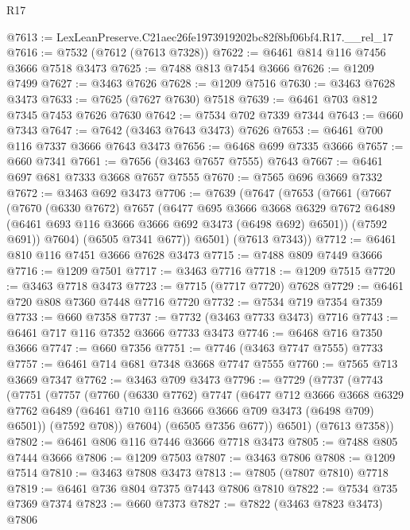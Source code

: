 \begin{lexlean}{R17}
\begin{coremodule}
@7613 := LexLeanPreserve.C21aec26fe1973919202bc82f8bf06bf4.R17.__rel_17
@7616 := @7532 (@7612 (@7613 @7328))
@7622 := @6461 @814 @116 @7456 @3666 @7518 @3473
@7625 := @7488 @813 @7454 @3666
@7626 := @1209 @7499
@7627 := @3463 @7626
@7628 := @1209 @7516
@7630 := @3463 @7628 @3473
@7633 := @7625 (@7627 @7630) @7518
@7639 := @6461 @703 @812 @7345 @7453 @7626 @7630
@7642 := @7534 @702 @7339 @7344
@7643 := @660 @7343
@7647 := @7642 (@3463 @7643 @3473) @7626
@7653 := @6461 @700 @116 @7337 @3666 @7643 @3473
@7656 := @6468 @699 @7335 @3666
@7657 := @660 @7341
@7661 := @7656 (@3463 @7657 @7555) @7643
@7667 := @6461 @697 @681 @7333 @3668 @7657 @7555
@7670 := @7565 @696 @3669 @7332
@7672 := @3463 @692 @3473
@7706 := @7639
    (@7647
      (@7653
        (@7661
          (@7667
            (@7670
              (@6330 @7672)
              @7657
              (@6477
                @695
                @3666
                @3668
                @6329
                @7672
                @6489
                (@6461 @693 @116 @3666 @3666 @692 @3473 (@6498 @692) @6501))
              (@7592 @691))
            @7604)
          (@6505 @7341 @677))
        @6501)
      (@7613 @7343))
@7712 := @6461 @810 @116 @7451 @3666 @7628 @3473
@7715 := @7488 @809 @7449 @3666
@7716 := @1209 @7501
@7717 := @3463 @7716
@7718 := @1209 @7515
@7720 := @3463 @7718 @3473
@7723 := @7715 (@7717 @7720) @7628
@7729 := @6461 @720 @808 @7360 @7448 @7716 @7720
@7732 := @7534 @719 @7354 @7359
@7733 := @660 @7358
@7737 := @7732 (@3463 @7733 @3473) @7716
@7743 := @6461 @717 @116 @7352 @3666 @7733 @3473
@7746 := @6468 @716 @7350 @3666
@7747 := @660 @7356
@7751 := @7746 (@3463 @7747 @7555) @7733
@7757 := @6461 @714 @681 @7348 @3668 @7747 @7555
@7760 := @7565 @713 @3669 @7347
@7762 := @3463 @709 @3473
@7796 := @7729
    (@7737
      (@7743
        (@7751
          (@7757
            (@7760
              (@6330 @7762)
              @7747
              (@6477
                @712
                @3666
                @3668
                @6329
                @7762
                @6489
                (@6461 @710 @116 @3666 @3666 @709 @3473 (@6498 @709) @6501))
              (@7592 @708))
            @7604)
          (@6505 @7356 @677))
        @6501)
      (@7613 @7358))
@7802 := @6461 @806 @116 @7446 @3666 @7718 @3473
@7805 := @7488 @805 @7444 @3666
@7806 := @1209 @7503
@7807 := @3463 @7806
@7808 := @1209 @7514
@7810 := @3463 @7808 @3473
@7813 := @7805 (@7807 @7810) @7718
@7819 := @6461 @736 @804 @7375 @7443 @7806 @7810
@7822 := @7534 @735 @7369 @7374
@7823 := @660 @7373
@7827 := @7822 (@3463 @7823 @3473) @7806

\end{coremodule}
\end{lexlean}
